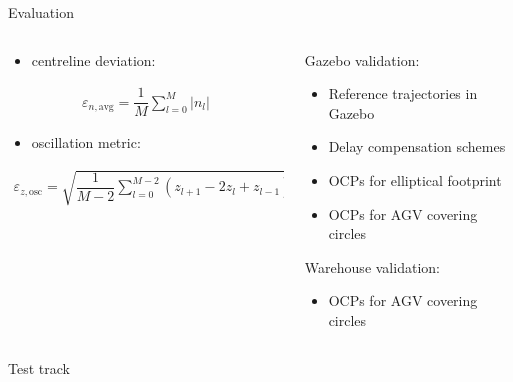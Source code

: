 \documentclass[10pt,aspectratio=1610]{beamer} %
\begin{document}
\begin{frame}{Evaluation}
	\begin{columns}[onlytextwidth]
		\begin{column}{0.6\textwidth}
			\begin{itemize}[label=\textbullet]
				\item centreline deviation:
			\end{itemize}
			\begin{align*}
				\varepsilon_{n,  \mathrm{avg}} = \dfrac{1}{M}\sum_{l=0}^{M} |n_{l}|
			\end{align*}
			\begin{itemize}[label=\textbullet]
				\item oscillation metric:
			\end{itemize}
			\begin{align*}
				\varepsilon_{z, \mathrm{osc}} = \sqrt{\dfrac{1}{M-2}\sum_{l=0}^{M-2} (z_{l+1} - 2z_{l} + z_{l-1})^2}
			\end{align*}
		\end{column}

		\begin{column}{0.4\textwidth}
			Gazebo validation:
			\begin{itemize}[label=\textbullet]
			\item[\textcolor{blue}{\textbullet}] Reference trajectories in Gazebo
			\item Delay compensation schemes
			\item OCPs for elliptical footprint
			\item[\textcolor{blue}{\textbullet}] OCPs for AGV covering circles
			\end{itemize}
			\hfill \break
			Warehouse validation:
			\begin{itemize}[label=\textbullet]
			\item[\textcolor{blue}{\textbullet}] OCPs for AGV covering circles
			\end{itemize}
		\end{column}
	\end{columns}
\end{frame}

\begin{frame}{Test track}
		\begin{center}
			\def\svgwidth{1\textwidth}
			
		\end{center}
\end{frame}
\end{document}
